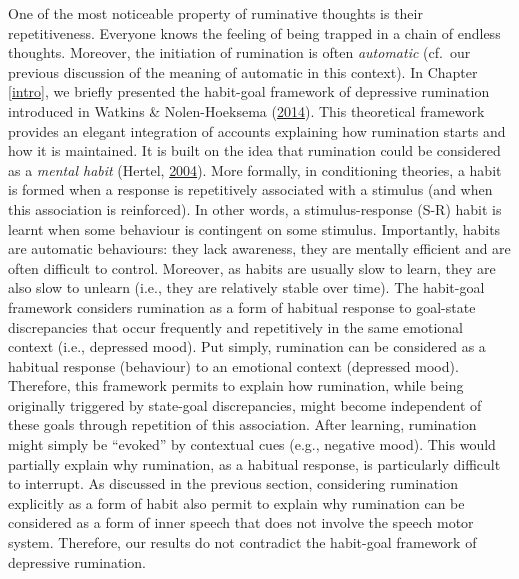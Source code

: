 \documentclass[a4paper,12pt,twoside,onecolumn,openright,final,oldfontcommands]{memoir}
\begin{document}
One of the most noticeable property of ruminative thoughts is their repetitiveness. Everyone knows the feeling of being trapped in a chain of endless thoughts. Moreover, the initiation of rumination is often \emph{automatic} (cf.~our previous discussion of the meaning of automatic in this context). In Chapter \ref{intro}, we briefly presented the habit-goal framework of depressive rumination introduced in Watkins \& Nolen-Hoeksema (\protect\hyperlink{ref-watkins_habit-goal_2014}{2014}). This theoretical framework provides an elegant integration of accounts explaining how rumination starts and how it is maintained. It is built on the idea that rumination could be considered as a \emph{mental habit} (Hertel, \protect\hyperlink{ref-hertel_memory_2004}{2004}). More formally, in conditioning theories, a habit is formed when a response is repetitively associated with a stimulus (and when this association is reinforced). In other words, a stimulus-response (S-R) habit is learnt when some behaviour is contingent on some stimulus. Importantly, habits are automatic behaviours: they lack awareness, they are mentally efficient and are often difficult to control. Moreover, as habits are usually slow to learn, they are also slow to unlearn (i.e., they are relatively stable over time). The habit-goal framework considers rumination as a form of habitual response to goal-state discrepancies that occur frequently and repetitively in the same emotional context (i.e., depressed mood). Put simply, rumination can be considered as a habitual response (behaviour) to an emotional context (depressed mood). Therefore, this framework permits to explain how rumination, while being originally triggered by state-goal discrepancies, might become independent of these goals through repetition of this association. After learning, rumination might simply be \enquote{evoked} by contextual cues (e.g., negative mood). This would partially explain why rumination, as a habitual response, is particularly difficult to interrupt. As discussed in the previous section, considering rumination explicitly as a form of habit also permit to explain why rumination can be considered as a form of inner speech that does not involve the speech motor system. Therefore, our results do not contradict the habit-goal framework of depressive rumination.
\end{document}
